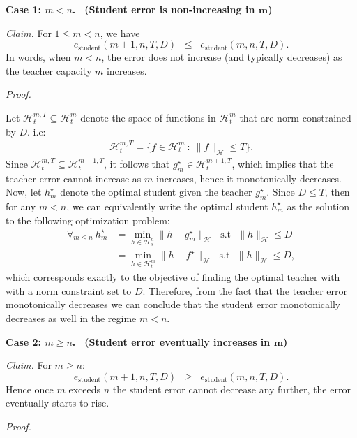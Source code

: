\medskip

\noindent
\textbf{Case 1: $m < n$. \, (Student error is non-increasing in $\bm m$)}
\smallskip

\noindent
\emph{Claim.} For $1 \le m < n$, we have
\[
	e_{\text{student}}(m+1,n,T,D)
	\;\;\le\;\;
	e_{\text{student}}(m,n,T,D). \label{claim:1}
\]
In words, when $m < n$, the error does not increase (and typically decreases) as the teacher capacity $m$ increases.

\noindent
\emph{Proof.}

Let $\mathcal{H}_t^{m,T} \subseteq \mathcal{H}_t^{m}$ denote the space of functions in $\mathcal{H}_t^{m}$ that are norm constrained by $D$. i.e:
\begin{align}
	\mathcal{H}_t^{m,T} = \{f \in \mathcal{H}_t^{m} ~:~\|f\|_\mathcal{H}\leq T\}.
\end{align}
Since $\mathcal{H}_t^{m,T} \subseteq \mathcal{H}_t^{m+1,T}$, it follows that $g^\star_m \in \mathcal{H}_t^{m+1,T}$, which implies that the teacher error cannot increase as $m$ increases, hence it monotonically decreases. Now, let $h^\star_m$ denote the optimal student given the teacher $g^\star_m$. Since $D\leq T$, then for any $m < n$, we can equivalently write the optimal student $h^\star_m$ as the solution to the following optimization problem:
\begin{align}
	\forall_{m \leq n}~h^{\star}_m & = \min_{h \in \mathcal{H}_s^n}\|h - g^\star_m\|_\mathcal{H} ~~~\text{s.t}~~~ \|h\|_\mathcal{H} \leq D \\
	                               & = \min_{h \in \mathcal{H}_t^m}\|h - f^\star\|_\mathcal{H} ~~~\text{s.t}~~~ \|h\|_\mathcal{H} \leq D,
\end{align}
which corresponds exactly to the objective of finding the optimal teacher with with a norm constraint set to $D$. Therefore, from the fact that the teacher error monotonically decreases we can conclude that the student error monotonically decreases as well in the regime $m< n$.


\medskip

\noindent
\textbf{Case 2: $m \geq n$. \, (Student error eventually increases in $\bm m$)}

\smallskip

\noindent
\emph{Claim.} For $m \geq n$:
\[
	e_{\text{student}}(m+1,n,T,D)
	\;\;\ge\;\;
	e_{\text{student}}(m,n,T,D).
\]
Hence once $m$ exceeds $n$ the student error cannot decrease any further, the error eventually starts to rise.

\noindent
\emph{Proof.}

